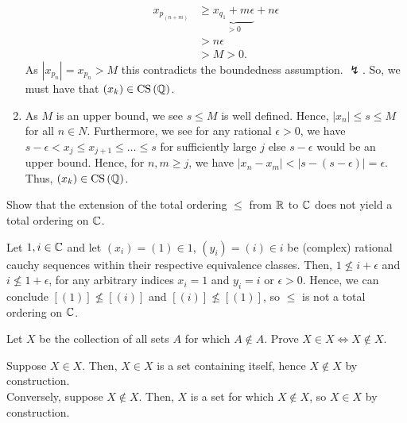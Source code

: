 \documentclass[a4paper]{article}
\begin{document}
\begin{solution}
\begin{enumerate}
\begin{align*}
	x_{p_{(n + m)}} &\ge\underbrace{ x_{q_1} + m\epsilon}_{> 0} + n \epsilon\\
		      &>   n \epsilon\\
		      &> M > 0
.\end{align*}
As \(\left| x_{p_{n}} \right| = x_{p_{n}} > M \) this contradicts the boundedness assumption. \(\lightning\). So, we must have that \(\left( x_{k} \right) \in \operatorname{CS} \left( \mathbb{Q} \right) \).
\item	As \(M\) is an upper bound, we see \(s\le M\) is well defined. Hence, \(\left| x_{n} \right|  \le s \le M\) for all \(n \in N\). Furthermore, we see for any rational \(\epsilon > 0\), we have \(s - \epsilon < x_{j} \le x_{j+1} \le \ldots \le s\) for sufficiently large \(j\) else \(s -\epsilon\) would be an upper bound. Hence, for \(n, m \ge j\), we have \(\left| x_{n} - x_{m} \right| < \left| s - \left( s - \epsilon \right)  \right|  = \epsilon\). Thus, \(\left( x_{k} \right) \in \operatorname{CS} \left( \mathbb{Q} \right) \).
	\end{enumerate}
\end{solution}
\newpage
\begin{problem}[12]
	Show that the extension of the total ordering \(\le\) from \(\mathbb{R}\) to \(\mathbb{C}\) does not yield a total ordering on \(\mathbb{C}\).
\end{problem}
\begin{solution}
	Let \(1, i \in \mathbb{C}\) and let \(\left( x_{i} \right) = \left( 1 \right)  \in 1\), \(\left( y_{i} \right) = \left( i \right) \in i\) be (complex) rational cauchy sequences within their respective equivalence classes. Then, \(1 \not\le i + \epsilon\) and \(i \not \le 1 + \epsilon\), for any arbitrary indices \(x_{i} = 1\) and \(y_{i} = i\) or \(\epsilon > 0\). Hence, we can conclude \(\left[ \left( 1 \right)  \right]  \not\le \left[ \left( i \right)  \right] \) and \(\left[ \left( i \right)  \right] \not \le \left[ \left( 1 \right)  \right] \), so \(\le \) is not a total ordering on \(\mathbb{C}\).
\end{solution}
\newpage
\begin{problem}[13]
Let \(X\) be the collection of all sets \(A\) for which \(A \not\in A\). Prove \(X \in X \iff X \not\in X\).
\end{problem}
\begin{solution}
	Suppose \(X \in X\). Then, \(X \in X\) is a set containing itself, hence \(X \not\in X\) by construction.\\
	Conversely, suppose \(X \not\in X\). Then, \(X\) is a set for which \(X \not\in X\), so \(X \in X\) by construction.
\end{solution}
\end{document}
